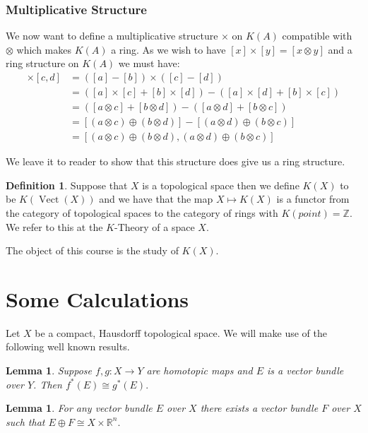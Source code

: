 \documentclass[a4paper,10pt]{article}
\theoremstyle{plain}%
\newtheorem{lem}[thm]{Lemma}
\theoremstyle{definition}
\newtheorem{defn}{Definition}
\theoremstyle{remark}
\newcommand{\ZZ}{\mathbb{Z}}
\newcommand{\RR}{\mathbb{R}}
\DeclareMathOperator{\Vect}{Vect}
\begin{document}
\subsubsection{Multiplicative Structure}

We now want to define a multiplicative structure $\times$ on $K(A)$ compatible with $\otimes$ which makes $K(A)$
a ring. As we wish to have $[x]\times[y]=[x\otimes y]$ and a ring structure on $K(A)$ we must have:
\begin{align*}
 [a,b]\times[c,d] &= ([a]-[b])\times([c]-[d])\\
		  &= ([a]\times[c]+[b]\times[d])-([a]\times[d]+[b]\times[c])\\
		  &= ([a\otimes c]+[b\otimes d])-([a\otimes d]+[b\otimes c])\\
		  &= [(a\otimes c)\oplus(b\otimes d)]-[(a\otimes d)\oplus(b\otimes c)]\\
		  &= [(a\otimes c)\oplus(b\otimes d),(a\otimes d)\oplus(b\otimes c)]
\end{align*}

We leave it to reader to show that this structure does give us a ring structure.

\begin{defn}
 Suppose that $X$ is a topological space then we define $K(X)$ to be $K(\Vect(X))$ and we have that the map $X\mapsto K(X)$
is a functor from the category of topological spaces to the category of rings with $K(point)=\ZZ$. We refer to this at the $K$-Theory of a space $X$.
\end{defn}

The object of this course is the study of $K(X)$.

\section{Some Calculations}

Let $X$ be a compact, Hausdorff topological space. We will make use of the following well known results.

\begin{lem}\label{htpyiso}
Suppose $f,g:X\to Y$ are homotopic maps and $E$ is a vector bundle over $Y$. Then $f^*(E)\cong g^* (E).$
\end{lem}

\begin{lem}
For any vector bundle $E$ over $X$ there exists a vector bundle $F$ over $X$ such that $E\oplus F\cong X \times \RR^n.$ 
\end{lem}
\end{document}
